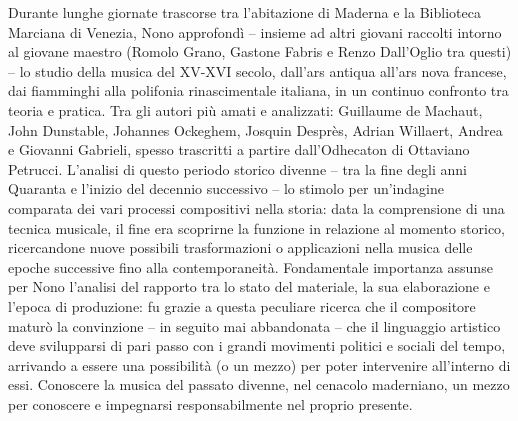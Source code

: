 Durante lunghe giornate trascorse tra l’abitazione di Maderna e la Biblioteca Marciana di Venezia, Nono approfondì – insieme ad altri giovani raccolti intorno al giovane maestro (Romolo Grano, Gastone Fabris e Renzo Dall’Oglio tra questi) – lo studio della musica del XV-XVI secolo, dall’ars antiqua all’ars nova francese, dai fiamminghi alla polifonia rinascimentale italiana, in un continuo confronto tra teoria e pratica. Tra gli autori più amati e analizzati: Guillaume de Machaut, John Dunstable, Johannes Ockeghem, Josquin Desprès, Adrian Willaert, Andrea e Giovanni Gabrieli, spesso trascritti a partire dall’Odhecaton di Ottaviano Petrucci. L’analisi di questo periodo storico divenne – tra la fine degli anni Quaranta e l’inizio del decennio successivo – lo stimolo per un’indagine comparata dei vari processi compositivi nella storia: data la comprensione di una tecnica musicale, il fine era scoprirne la funzione in relazione al momento storico, ricercandone nuove possibili trasformazioni o applicazioni nella musica delle epoche successive fino alla contemporaneità. Fondamentale importanza assunse per Nono l’analisi del rapporto tra lo stato del materiale, la sua elaborazione e l’epoca di produzione: fu grazie a questa peculiare ricerca che il compositore maturò la convinzione – in seguito mai abbandonata – che il linguaggio artistico deve svilupparsi di pari passo con i grandi movimenti politici e sociali del tempo, arrivando a essere una possibilità (o un mezzo) per poter intervenire all’interno di essi. Conoscere la musica del passato divenne, nel cenacolo maderniano, un mezzo per conoscere e impegnarsi responsabilmente nel proprio presente.


